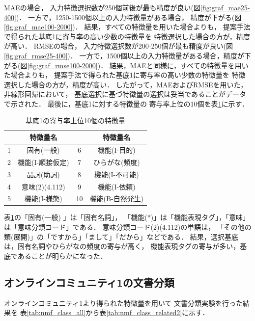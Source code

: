 \documentclass[12pt,a4paper,twocolumn,twoside]{jsik}
\begin{document}
MAEの場合，
入力特徴選択数が250個前後が最も精度が良い(図\ref{fig:graf_mae25-400})．
一方で，1250-1500個以上の入力特徴量がある場合，
精度が下がる(図\ref{fig:graf_mae100-2000})．
%
結果，すべての特徴量を用いた場合よりも，
提案手法で得られた基底1に寄与率の高い少数の特徴量を
特徴選択した場合の方が，精度が高い．
%
RMSEの場合，
入力特徴選択数が200-250個が最も精度が良い(図\ref{fig:graf_rmse25-400})．
一方で，1500個以上の入力特徴量がある場合，精度が下がる(図\ref{fig:graf_rmse100-2000})．
%
結果，MAEと同様に，すべての特徴量を用いた場合よりも，
提案手法で得られた基底1に寄与率の高い少数の特徴量を
特徴選択した場合の方が，精度が高い．
%
したがって，MAEおよびRMSEを用いた，非線形回帰において，
基底選択に基づ特徴量の選択は妥当であることがデータで示された．
%
最後に，基底1に対する特徴量の
寄与率上位の10個を表\ref{tab:nmf_h1_view}に示す．
%
\begin{table}[htb]
  \caption{基底1の寄与率上位10個の特徴量}
  \label{tab:nmf_h1_view}
  \begin{center}
  \begin{tabular}{|c|c|c|c|} \hline
    & 特徴量名 & & 特徴量名 \\ \hline \hline
    1 & 固有(一般) & 6 & 機能(I-目的) \\ \hline
    2 & 機能(I-順接仮定)  & 7 & ひらがな(頻度) \\ \hline
    3 & 品詞(助詞)  & 8 & 機能(I-不可能) \\ \hline
    4 & 意味(2)(4.112)  & 9 & 機能(I-依頼) \\ \hline
    5 & 機能(I-様態)  & 10 & 機能(B-自然発生) \\ \hline
  \end{tabular}
  \end{center}
\end{table}

表\ref{tab:nmf_h1_view}の「固有(一般) 」は「固有名詞」，
「機能(*)」は「機能表現タグ」，「意味」は「意味分類コード」である．
%
意味分類コード(2)(4.112)の単語は，
「その他の類(展開)」の「ですから」「まして」「だから」などである．
%
結果，選択基底は，固有名詞やひらがなの頻度の寄与が高く，
機能表現タグの寄与が多い，基底であることが明らかになった．

\newpage
\subsection{オンラインコミュニティ1の文書分類}\label{result_2}
オンラインコミュニティ1より得られた特徴量を用いて
文書分類実験を行った結果を
表\ref{tab:nmf_class_all}から表\ref{tab:nmf_class_related2}に示す．
\end{document}
